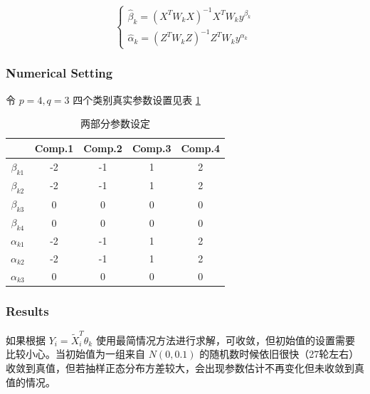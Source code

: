 \documentclass[12pt, a4paper, oneside]{article}
\numberwithin{equation}{section}
\begin{document}
\begin{equation}
	\left\{\begin{array}{l}
		\hat{\beta}_{k}=  (X^{T} W_k X)^{-1} X^{T} W_k y^{\beta_k}\\
		\hat{\alpha}_{k}= (Z^T W_k Z)^{-1}Z^T W_k y^{\alpha_k}
	\end{array}\right.
	\label{eq:two-part2}
\end{equation}

\subsubsection{Numerical Setting}

令 $p=4,q=3$ 四个类别真实参数设置见表 \ref{tb:coef_true_twopart}

\begin{table}[h]
	\centering
	\caption{两部分参数设定}
	\begin{tabular}{ccccc}
		\toprule
		& Comp.1 & Comp.2 & Comp.3 & Comp.4 \\
		\midrule
		$\beta_{k1}$  & -2      & -1      & 1      & 2     \\
		$\beta_{k2}$  & -2      & -1      & 1      & 2     \\
		$\beta_{k3}$  & 0      & 0      & 0      & 0      \\
		$\beta_{k4}$  & 0      & 0      & 0      & 0      \\
		$\alpha_{k1}$  & -2      & -1      & 1      & 2      \\
		$\alpha_{k2}$  & -2      & -1      & 1      & 2      \\
		$\alpha_{k3}$  & 0      & 0      & 0      & 0      \\
		\bottomrule
	\end{tabular}
	\label{tb:coef_true_twopart}
\end{table}

\subsubsection{Results}

如果根据 $Y_i = \tilde X_i^T\theta_k$ 使用最简情况方法进行求解，可收敛，但初始值的设置需要比较小心。当初始值为一组来自 $N(0,0.1)$ 的随机数时候依旧很快（27轮左右）收敛到真值，但若抽样正态分布方差较大，会出现参数估计不再变化但未收敛到真值的情况。

\end{document}
